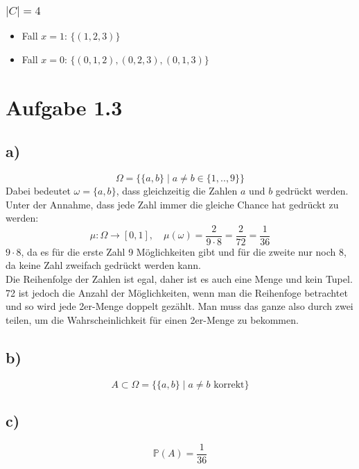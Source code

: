 \documentclass{article} %
\begin{document}
\subsubsection{$|C| = 4$}
\begin{itemize}
    \item Fall $x = 1$: $\{(1,2,3)\}$
    \item Fall $x = 0$: $\{(0,1,2), (0,2,3), (0,1,3)\}$
\end{itemize}

\section{Aufgabe 1.3}
\subsection{a)}
\[
\Omega = \{\{a,b\} \mid a \neq b \in \{1,..,9\}\}
\]
Dabei bedeutet $\omega = \{a,b\}$, dass gleichzeitig die Zahlen $a$ und $b$ gedrückt werden. \\ Unter der Annahme, dass jede Zahl immer die gleiche Chance hat gedrückt zu werden: 
\[
\mu: \Omega \rightarrow [0,1], \quad \mu(\omega) = \frac{2}{9 \cdot 8} = \frac{2}{72} = \frac{1}{36}
\]
$9 \cdot 8$, da es für die erste Zahl 9 Möglichkeiten gibt und für die zweite nur noch 8, da keine Zahl zweifach gedrückt werden kann. \\
Die Reihenfolge der Zahlen ist egal, daher ist es auch eine Menge und kein Tupel. 72 ist jedoch die Anzahl der Möglichkeiten, wenn man die Reihenfoge betrachtet und so wird jede 2er-Menge doppelt gezählt. Man muss das ganze also durch zwei teilen, um die Wahrscheinlichkeit für einen 2er-Menge zu bekommen. 
\subsection{b)}
\[
A \subset \Omega = \{\{a,b\} \mid a \neq b \text{ korrekt}\}
\]
\subsection{c)}
\[
\mathbb{P}(A) = \frac{1}{36}
\]
\end{document}
